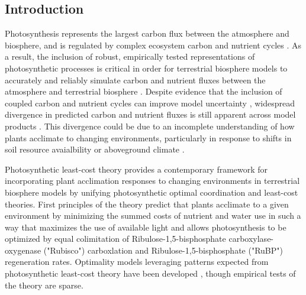 \begin{singlespace}
    \chapter{\textbf{Introduction}}
\end{singlespace}

Photosynthesis represents the largest carbon flux between the atmosphere and biosphere, and is regulated by complex ecosystem carbon and nutrient cycles . As a result, the inclusion of robust, empirically tested representations of photosynthetic processes is critical in order for terrestrial biosphere models to accurately and reliably simulate carbon and nutrient fluxes between the atmosphere and terrestrial biosphere . Despite evidence that the inclusion of coupled carbon and nutrient cycles can improve model uncertainty , widespread divergence in predicted carbon and nutrient fluxes is still apparent across model products . This divergence could be due to an incomplete understanding of how plants acclimate to changing environments, particularly in response to shifts in soil resource avaialbility or aboveground climate .

Photosynthetic least-cost theory  provides a contemporary framework for incorporating plant acclimation responses to changing environments in terrestrial biosphere models by unifying photosynthetic optimal coordination  and least-cost  theories. First principles of the theory predict that plants acclimate to a given environment by minimizing the summed costs of nutrient and water use in such a way that maximizes the use of available light and allows photosynthesis to be optimized by equal colimitation of Ribulose-1,5-bisphosphate carboxylase-oxygenase ("Rubisco") carboxlation and Ribulose-1,5-bisphosphate ("RuBP") regeneration rates. Optimality models leveraging patterns expected from photosynthetic least-cost theory have been developed , though empirical tests of the theory are sparse.

